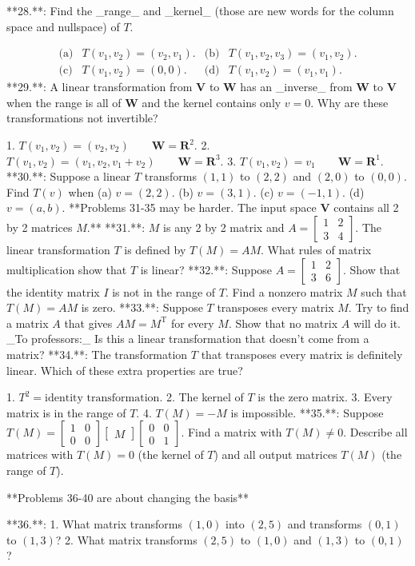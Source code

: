 

**28.**: Find the _range_ and _kernel_ (those are new words for the column space and nullspace) of \(T\).

\[\begin{array}{llll}\mbox{(a)}&T(v_{1},v_{2})=(v_{2},v_{1}).&\mbox{(b)}&T(v_{1} ,v_{2},v_{3})=(v_{1},v_{2}).\\ \mbox{(c)}&T(v_{1},v_{2})=(0,0).&\mbox{(d)}&T(v_{1},v_{2})=(v_{1},v_{1}).\end{array}\]
**29.**: A linear transformation from \(\mathbf{V}\) to \(\mathbf{W}\) has an _inverse_ from \(\mathbf{W}\) to \(\mathbf{V}\) when the range is all of \(\mathbf{W}\) and the kernel contains only \(v=0\). Why are these transformations not invertible?

1. \(T(v_{1},v_{2})=(v_{2},v_{2})\qquad\mathbf{W}=\mathbf{R}^{2}\).
2. \(T(v_{1},v_{2})=(v_{1},v_{2},v_{1}+v_{2})\qquad\mathbf{W}=\mathbf{R}^{3}\).
3. \(T(v_{1},v_{2})=v_{1}\qquad\mathbf{W}=\mathbf{R}^{1}\).
**30.**: Suppose a linear \(T\) transforms \((1,1)\) to \((2,2)\) and \((2,0)\) to \((0,0)\). Find \(T(v)\) when (a) \(v=(2,2)\). (b) \(v=(3,1)\). (c) \(v=(-1,1)\). (d) \(v=(a,b)\).
**Problems 31-35 may be harder. The input space \(\mathbf{V}\) contains all 2 by 2 matrices \(M\).**
**31.**: \(M\) is any 2 by 2 matrix and \(A=\left[\begin{smallmatrix}1&2\\ 3&4\end{smallmatrix}\right]\). The linear transformation \(T\) is defined by \(T(M)=AM\). What rules of matrix multiplication show that \(T\) is linear?
**32.**: Suppose \(A=\left[\begin{smallmatrix}1&2\\ 3&6\end{smallmatrix}\right]\). Show that the identity matrix \(I\) is not in the range of \(T\). Find a nonzero matrix \(M\) such that \(T(M)=AM\) is zero.
**33.**: Suppose \(T\) transposes every matrix \(M\). Try to find a matrix \(A\) that gives \(AM=M^{\mathrm{T}}\) for every \(M\). Show that no matrix \(A\) will do it. _To professors:_ Is this a linear transformation that doesn't come from a matrix?
**34.**: The transformation \(T\) that transposes every matrix is definitely linear. Which of these extra properties are true?

1. \(T^{2}=\mbox{identity transformation}\).
2. The kernel of \(T\) is the zero matrix.
3. Every matrix is in the range of \(T\).
4. \(T(M)=-M\) is impossible.
**35.**: Suppose \(T(M)=\left[\begin{smallmatrix}1&0\\ 0&0\end{smallmatrix}\right]\left[\begin{smallmatrix}M\end{smallmatrix}\right] \left[\begin{smallmatrix}0&0\\ 0&1\end{smallmatrix}\right]\). Find a matrix with \(T(M)\neq 0\). Describe all matrices with \(T(M)=0\) (the kernel of \(T\)) and all output matrices \(T(M)\) (the range of \(T\)).

**Problems 36-40 are about changing the basis**

**36.**:
1. What matrix transforms \((1,0)\) into \((2,5)\) and transforms \((0,1)\) to \((1,3)\)?
2. What matrix transforms \((2,5)\) to \((1,0)\) and \((1,3)\) to \((0,1)\)?